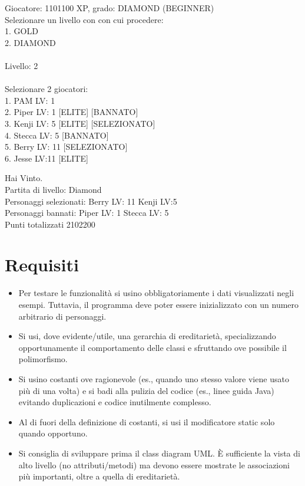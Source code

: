\documentclass{article}
\begin{document}
\begin{tcolorbox}[
    title=Esempio 3
]
Giocatore: 1101100 XP, grado: DIAMOND (BEGINNER) \\
Selezionare un livello con con cui procedere: \\
1. GOLD \\
2. DIAMOND \\
\\
Livello: 2 \\
\\
Selezionare 2 giocatori:\\
1. PAM LV: 1\\
2. Piper LV: 1 [ELITE] [BANNATO]\\
3. Kenji LV: 5 [ELITE] [SELEZIONATO]\\
4. Stecca LV: 5 [BANNATO]\\
5. Berry LV: 11 [SELEZIONATO]\\
6. Jesse LV:11 [ELITE]\\
\end{tcolorbox}

\vspace{0.3cm}

\begin{tcolorbox}[
    title=Esempio 4
]
Hai Vinto. \\
Partita di livello: Diamond \\
Personaggi selezionati: Berry LV: 11 Kenji LV:5 \\
Personaggi bannati: Piper LV: 1 Stecca LV: 5 \\
Punti totalizzati 2102200
\end{tcolorbox}

\section*{Requisiti}
\begin{itemize}
    \item Per testare le funzionalità si usino obbligatoriamente i dati visualizzati negli esempi. Tuttavia, il programma deve poter essere inizializzato con un numero arbitrario di personaggi.
    \item Si usi, dove evidente/utile, una gerarchia di ereditarietà, specializzando opportunamente il comportamento delle classi e sfruttando ove possibile il polimorfismo.
    \item Si usino costanti ove ragionevole (es., quando uno stesso valore viene usato più di una volta) e si badi alla pulizia del codice (es., linee guida Java) evitando duplicazioni e codice inutilmente complesso.
    \item Al di fuori della definizione di costanti, si usi il modificatore static solo quando opportuno.
\end{itemize}

\begin{itemize}
    \item[i)] Si consiglia di sviluppare prima il class diagram UML. È sufficiente la vista di alto livello (no attributi/metodi) ma devono essere mostrate le associazioni più importanti, oltre a quella di ereditarietà.
\end{itemize}
\end{document}
